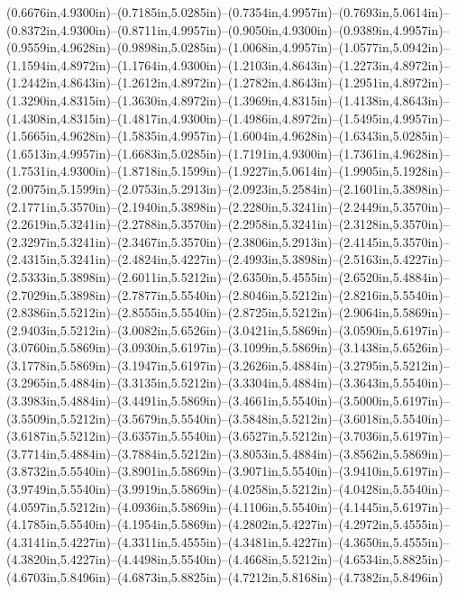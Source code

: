 (0.6676in,4.9300in)--(0.7185in,5.0285in)--(0.7354in,4.9957in)--(0.7693in,5.0614in)--(0.8372in,4.9300in)--(0.8711in,4.9957in)--(0.9050in,4.9300in)--(0.9389in,4.9957in)--(0.9559in,4.9628in)--(0.9898in,5.0285in)--(1.0068in,4.9957in)--(1.0577in,5.0942in)--(1.1594in,4.8972in)--(1.1764in,4.9300in)--(1.2103in,4.8643in)--(1.2273in,4.8972in)--(1.2442in,4.8643in)--(1.2612in,4.8972in)--(1.2782in,4.8643in)--(1.2951in,4.8972in)--(1.3290in,4.8315in)--(1.3630in,4.8972in)--(1.3969in,4.8315in)--(1.4138in,4.8643in)--(1.4308in,4.8315in)--(1.4817in,4.9300in)--(1.4986in,4.8972in)--(1.5495in,4.9957in)--(1.5665in,4.9628in)--(1.5835in,4.9957in)--(1.6004in,4.9628in)--(1.6343in,5.0285in)--(1.6513in,4.9957in)--(1.6683in,5.0285in)--(1.7191in,4.9300in)--(1.7361in,4.9628in)--(1.7531in,4.9300in)--(1.8718in,5.1599in)--(1.9227in,5.0614in)--(1.9905in,5.1928in)--(2.0075in,5.1599in)--(2.0753in,5.2913in)--(2.0923in,5.2584in)--(2.1601in,5.3898in)--(2.1771in,5.3570in)--(2.1940in,5.3898in)--(2.2280in,5.3241in)--(2.2449in,5.3570in)--(2.2619in,5.3241in)--(2.2788in,5.3570in)--(2.2958in,5.3241in)--(2.3128in,5.3570in)--(2.3297in,5.3241in)--(2.3467in,5.3570in)--(2.3806in,5.2913in)--(2.4145in,5.3570in)--(2.4315in,5.3241in)--(2.4824in,5.4227in)--(2.4993in,5.3898in)--(2.5163in,5.4227in)--(2.5333in,5.3898in)--(2.6011in,5.5212in)--(2.6350in,5.4555in)--(2.6520in,5.4884in)--(2.7029in,5.3898in)--(2.7877in,5.5540in)--(2.8046in,5.5212in)--(2.8216in,5.5540in)--(2.8386in,5.5212in)--(2.8555in,5.5540in)--(2.8725in,5.5212in)--(2.9064in,5.5869in)--(2.9403in,5.5212in)--(3.0082in,5.6526in)--(3.0421in,5.5869in)--(3.0590in,5.6197in)--(3.0760in,5.5869in)--(3.0930in,5.6197in)--(3.1099in,5.5869in)--(3.1438in,5.6526in)--(3.1778in,5.5869in)--(3.1947in,5.6197in)--(3.2626in,5.4884in)--(3.2795in,5.5212in)--(3.2965in,5.4884in)--(3.3135in,5.5212in)--(3.3304in,5.4884in)--(3.3643in,5.5540in)--(3.3983in,5.4884in)--(3.4491in,5.5869in)--(3.4661in,5.5540in)--(3.5000in,5.6197in)--(3.5509in,5.5212in)--(3.5679in,5.5540in)--(3.5848in,5.5212in)--(3.6018in,5.5540in)--(3.6187in,5.5212in)--(3.6357in,5.5540in)--(3.6527in,5.5212in)--(3.7036in,5.6197in)--(3.7714in,5.4884in)--(3.7884in,5.5212in)--(3.8053in,5.4884in)--(3.8562in,5.5869in)--(3.8732in,5.5540in)--(3.8901in,5.5869in)--(3.9071in,5.5540in)--(3.9410in,5.6197in)--(3.9749in,5.5540in)--(3.9919in,5.5869in)--(4.0258in,5.5212in)--(4.0428in,5.5540in)--(4.0597in,5.5212in)--(4.0936in,5.5869in)--(4.1106in,5.5540in)--(4.1445in,5.6197in)--(4.1785in,5.5540in)--(4.1954in,5.5869in)--(4.2802in,5.4227in)--(4.2972in,5.4555in)--(4.3141in,5.4227in)--(4.3311in,5.4555in)--(4.3481in,5.4227in)--(4.3650in,5.4555in)--(4.3820in,5.4227in)--(4.4498in,5.5540in)--(4.4668in,5.5212in)--(4.6534in,5.8825in)--(4.6703in,5.8496in)--(4.6873in,5.8825in)--(4.7212in,5.8168in)--(4.7382in,5.8496in) 